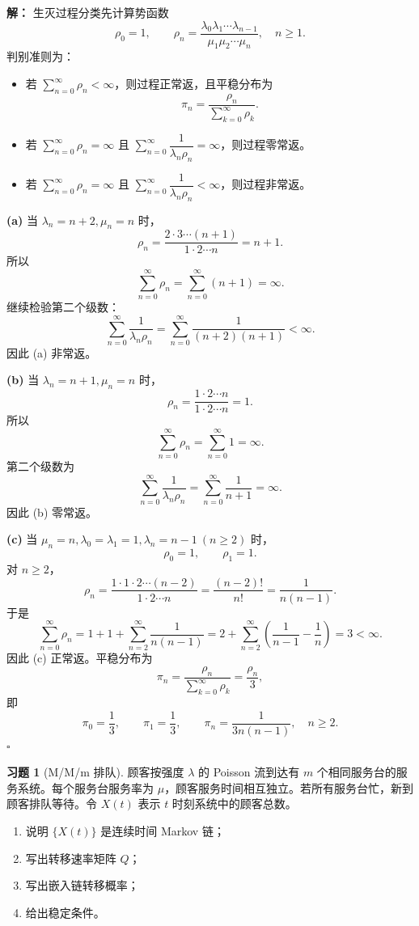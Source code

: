 \documentclass[12pt,a4paper,openany]{ctexrep}
\theoremstyle{definition}
\newtheorem{exercise}{习题}[section]
\newenvironment{solution}{\par\noindent\textbf{解：}}{\hfill$\square$\par}
\begin{document}
\begin{solution}
生灭过程分类先计算势函数
\[
\rho_0=1,\qquad
\rho_n=\frac{\lambda_0\lambda_1\cdots\lambda_{n-1}}
{\mu_1\mu_2\cdots\mu_n},\quad n\ge1.
\]
判别准则为：
\begin{itemize}
	\item 若 $\sum_{n=0}^{\infty}\rho_n<\infty$，则过程正常返，且平稳分布为
	\[
	\pi_n=\frac{\rho_n}{\sum_{k=0}^{\infty}\rho_k}.
	\]
	\item 若 $\sum_{n=0}^{\infty}\rho_n=\infty$ 且 $\sum_{n=0}^{\infty}\dfrac1{\lambda_n\rho_n}=\infty$，则过程零常返。
	\item 若 $\sum_{n=0}^{\infty}\rho_n=\infty$ 且 $\sum_{n=0}^{\infty}\dfrac1{\lambda_n\rho_n}<\infty$，则过程非常返。
\end{itemize}

\textbf{(a)} 当 $\lambda_n=n+2,\mu_n=n$ 时，
\[
\rho_n=\frac{2\cdot3\cdots(n+1)}{1\cdot2\cdots n}=n+1.
\]
所以
\[
\sum_{n=0}^{\infty}\rho_n=\sum_{n=0}^{\infty}(n+1)=\infty.
\]
继续检验第二个级数：
\[
\sum_{n=0}^{\infty}\frac1{\lambda_n\rho_n}
=\sum_{n=0}^{\infty}\frac1{(n+2)(n+1)}<\infty.
\]
因此 (a) 非常返。

\textbf{(b)} 当 $\lambda_n=n+1,\mu_n=n$ 时，
\[
\rho_n=\frac{1\cdot2\cdots n}{1\cdot2\cdots n}=1.
\]
所以
\[
\sum_{n=0}^{\infty}\rho_n=\sum_{n=0}^{\infty}1=\infty.
\]
第二个级数为
\[
\sum_{n=0}^{\infty}\frac1{\lambda_n\rho_n}
=\sum_{n=0}^{\infty}\frac1{n+1}=\infty.
\]
因此 (b) 零常返。

\textbf{(c)} 当 $\mu_n=n,\lambda_0=\lambda_1=1,\lambda_n=n-1\ (n\ge2)$ 时，
\[
\rho_0=1,\qquad \rho_1=1.
\]
对 $n\ge2$，
\[
\rho_n=
\frac{1\cdot1\cdot2\cdots(n-2)}{1\cdot2\cdots n}
=\frac{(n-2)!}{n!}
=\frac1{n(n-1)}.
\]
于是
\[
\sum_{n=0}^{\infty}\rho_n
=1+1+\sum_{n=2}^{\infty}\frac1{n(n-1)}
=2+\sum_{n=2}^{\infty}\left(\frac1{n-1}-\frac1n\right)
=3<\infty.
\]
因此 (c) 正常返。平稳分布为
\[
\pi_n=\frac{\rho_n}{\sum_{k=0}^{\infty}\rho_k}=\frac{\rho_n}{3},
\]
即
\[
\pi_0=\frac13,\qquad
\pi_1=\frac13,\qquad
\pi_n=\frac1{3n(n-1)},\quad n\ge2.
\]
\end{solution}

\begin{exercise}[M/M/m 排队]
顾客按强度 $\lambda$ 的 Poisson 流到达有 $m$ 个相同服务台的服务系统。每个服务台服务率为 $\mu$，顾客服务时间相互独立。若所有服务台忙，新到顾客排队等待。令 $X(t)$ 表示 $t$ 时刻系统中的顾客总数。
\begin{enumerate}[label=(\arabic*)]
	\item 说明 $\{X(t)\}$ 是连续时间 Markov 链；
	\item 写出转移速率矩阵 $Q$；
	\item 写出嵌入链转移概率；
	\item 给出稳定条件。
\end{enumerate}
\end{exercise}
\end{document}
